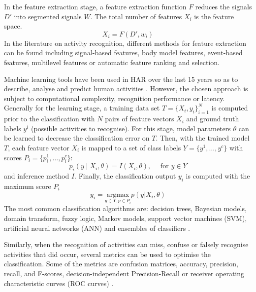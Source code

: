 \documentclass[10pt,journal,compsoc]{IEEEtran}
\begin{document}
In the feature extraction stage, a feature extraction function 
$F$ reduces the signals $D'$  into segmented signals $W$.
The total number of features $X_i$ is the feature space.
\begin{equation}
X_i = F ( D', w_i)
\end{equation} 
In the literature on activity recognition, different methods 
for feature extraction can be found including signal-based 
features, body model features, event-based features, 
multilevel features or automatic feature ranking and selection.


Machine learning tools have been used in HAR over 
the last 15 years so as to describe, analyse and predict human 
activities \cite{bulling2014}. However, the chosen approach is subject to 
computational complexity, recognition performance or latency.
Generally for the learning stage, a training data set 
$T = \{ X_i, y_i \}  ^N _ {i=1}$ is computed prior to the classification 
with $N$ pairs of feature vectors $X_i$ and ground truth labels 
$y^i$ (possible activities to recognise). For this stage, model 
parameters $\theta$ can be learned to decrease the classification 
error on $T$. Then, with the trained model $T$, each feature 
vector $X_i$  is mapped to a set of class labels $Y= \{ y^1, \dots , y^c \}$ 
with scores $P_i = \{ p^1_i, \dots, p^c_i \}$:
\begin{equation}
p_i ( y \mid X_i, \theta) = I (X_i, \theta), \quad \mbox{ for } y \in Y
\end{equation} 
and inference method $I$. Finally, the classification output $y_i$ 
is computed with the maximum score $P_i$
\begin{equation}
y_i  = 
\underset{ y \in Y, p \in P_i }{\text{argmax}}   p(y | X_i, \theta)
\end{equation} 
The most common classification algorithms are: decision 
trees, Bayesian models, domain transform, fuzzy logic, 
Markov models, support vector machines (SVM), artificial 
neural networks (ANN) and ensembles of classifiers \cite{Lara2013}.


Similarly, when the recognition of activities can miss,
confuse or falsely recognise activities that did occur, several 
metrics can be used to optimise the classification. Some 
of the metrics are confusion matrices, accuracy, precision, 
recall, and F-scores, decision-independent Precision-Recall 
or receiver operating characteristic curves (ROC curves) \cite{bulling2014}.
\end{document}
